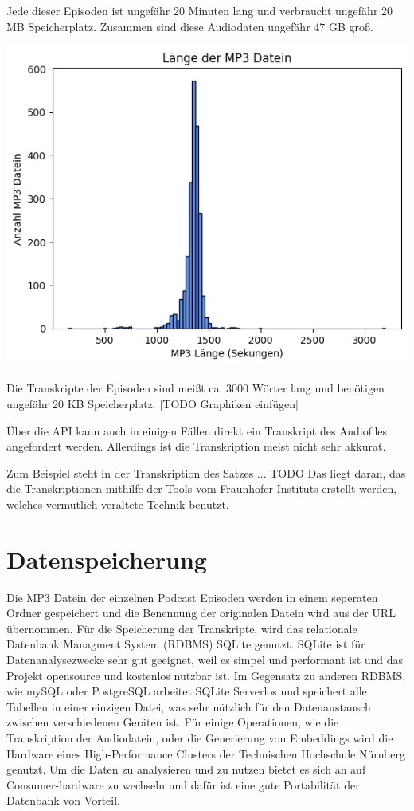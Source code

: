 Jede dieser Episoden ist ungefähr 20 Minuten lang und verbraucht ungefähr 20 MB Speicherplatz.
Zusammen sind diese Audiodaten ungefähr 47 GB groß.

\includegraphics[width=\linewidth]{figures/mp3_length.png}

Die Transkripte der Episoden sind meißt ca. 3000 Wörter lang und benötigen ungefähr 20 KB Speicherplatz. [TODO Graphiken einfügen]







Über die API kann auch in einigen Fällen direkt ein Transkript des Audiofiles angefordert werden. 
Allerdings ist die Transkription meist nicht sehr akkurat.


Zum Beispiel steht in der Transkription des Satzes ... TODO
Das liegt daran, das die Transkriptionen mithilfe der Tools vom Fraunhofer Instituts erstellt werden, welches vermutlich veraltete Technik benutzt.

\section{Datenspeicherung}

Die MP3 Datein der einzelnen Podcast Episoden werden in einem seperaten Ordner gespeichert und die Benennung der originalen Datein wird aus der URL übernommen.
Für die Speicherung der Transkripte, wird das relationale Datenbank Managment System (RDBMS) SQLite  genutzt.
SQLite ist für Datenanalysezwecke sehr gut geeignet, weil es simpel und performant ist und das Projekt opensource und kostenlos nutzbar ist.
Im Gegensatz zu anderen RDBMS, wie mySQL oder PostgreSQL arbeitet SQLite Serverlos und speichert alle Tabellen in einer einzigen Datei, was sehr nützlich für den Datenaustausch zwischen verschiedenen Geräten ist.
Für einige Operationen, wie die Transkription der Audiodatein, oder die Generierung von Embeddings wird die Hardware eines High-Performance Clusters der Technischen Hochschule Nürnberg genutzt. 
Um die Daten zu analysieren und zu nutzen bietet es sich an auf Consumer-hardware zu wechseln und dafür ist eine gute Portabilität der Datenbank von Vorteil.

